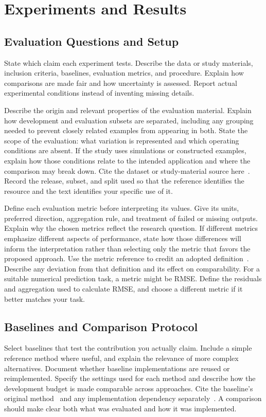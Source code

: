 \section{Experiments and Results}
\label{sec:experiments}
\subsection{Evaluation Questions and Setup}
State which claim each experiment tests. Describe the data or study
materials, inclusion criteria, baselines, evaluation metrics, and procedure.
Explain how comparisons are made fair and how uncertainty is assessed.
Report actual experimental conditions instead of inventing missing details.

Describe the origin and relevant properties of the evaluation material.
Explain how development and evaluation subsets are separated, including
any grouping needed to prevent closely related examples from appearing in
both. State the scope of the evaluation: what variation is represented and
which operating conditions are absent. If the study uses simulations or
constructed examples, explain how those conditions relate to the intended
application and where the comparison may break down.
Cite the dataset or study-material source here~\cite{dataset}. Record the
release, subset, and split used so that the reference identifies the resource
and the text identifies your specific use of it.

Define each evaluation metric before interpreting its values. Give its
units, preferred direction, aggregation rule, and treatment of failed or
missing outputs. Explain why the chosen metrics reflect the research
question. If different metrics emphasize different aspects of performance,
state how those differences will inform the interpretation rather than
selecting only the metric that favors the proposed approach.
Use the metric reference to credit an adopted definition~\cite{metric}.
Describe any deviation from that definition and its effect on comparability.
For a suitable numerical prediction task, a metric might be
\ac{RMSE}. Define the residuals and aggregation used to calculate
\ac{RMSE}, and choose a different metric if it better matches your task.

\subsection{Baselines and Comparison Protocol}
Select baselines that test the contribution you actually claim. Include a
simple reference method where useful, and explain the relevance of more
complex alternatives. Document whether baseline implementations are reused
or reimplemented. Specify the settings used for each method and describe
how the development budget is made comparable across approaches.
Cite the baseline's original method~\cite{baseline} and any implementation
dependency separately~\cite{software}. A comparison should make clear both
what was evaluated and how it was implemented.

